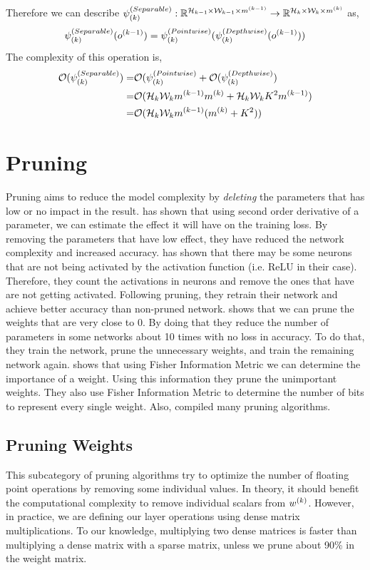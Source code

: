 Therefore we can describe $\psi^{(Separable)}_{(k)} : \mathbb{R}^{\mathcal{H}_{k-1} \times \mathcal{W}_{k-1} \times m^{(k-1)}} \rightarrow \mathbb{R}^{\mathcal{H}_{k} \times \mathcal{W}_{k} \times m^{(k)}}$ as,
$$ \psi^{(Separable)}_{(k)}(o^{(k-1)}) = \psi^{(Pointwise)}_{(k)} ( \psi^{(Depthwise)}_{(k)}(o^{(k-1)}) ) $$
The complexity of this operation is, 
\begin{equation*}
\begin{split}
\mathcal{O}(\psi^{(Separable)}_{(k)}) =& \mathcal{O}(\psi^{(Pointwise)}_{(k)} + \mathcal{O} (\psi^{(Depthwise)}_{(k)}) \\
=& \mathcal{O}(\mathcal{H}_{k}\mathcal{W}_{k}m^{(k-1)}m^{(k)} + \mathcal{H}_{k}\mathcal{W}_{k}K^2m^{(k-1)}) \\
=& \mathcal{O}(\mathcal{H}_{k}\mathcal{W}_{k}m^{(k-1)}(m^{(k)} + K^2))
\end{split}
 \end{equation*}

\section{Pruning}

Pruning aims to reduce the model complexity by \textit{deleting} the parameters that has low or no impact in the result. \cite{lecun1989optimal} has shown that using second order derivative of a parameter, we can estimate the effect it will have on the training loss. By removing the parameters that have low effect, they have reduced the network complexity and increased accuracy. \cite{Hu:2016aa} has shown that there may be some neurons that are not being activated by the activation function (i.e. ReLU in their case). Therefore, they count the activations in neurons and remove the ones that have are not getting activated. Following pruning, they retrain their network and achieve better accuracy than non-pruned network. \cite{han2015learning} shows that we can prune the weights that are very close to 0. By doing that they reduce the number of parameters in some networks about 10 times with no loss in accuracy. To do that, they train the network, prune the unnecessary weights, and train the remaining network again.  \cite{tu2016reducing} shows that using Fisher Information Metric we can determine the importance of a weight. Using this information they prune the unimportant weights. They also use Fisher Information Metric to determine the number of bits to represent every single weight. Also, \cite{reed1993pruning} compiled many pruning algorithms.

\subsection{Pruning Weights}
This subcategory of pruning algorithms try to optimize the number of floating point operations by removing some individual values. In theory, it should benefit the computational complexity to remove individual scalars from $w^{(k)}$. However, in practice, we are defining our layer operations using dense matrix multiplications. To our knowledge, multiplying two dense matrices is faster than multiplying a dense matrix with a sparse matrix, unless we prune about 90\% in the weight matrix. 

